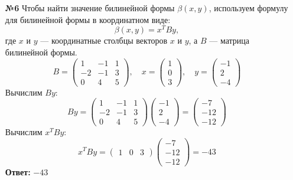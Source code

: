 \documentclass[a4paper]{article}
\begin{document}
\begin{enumerate}
    \item[\textbf{№6}]Чтобы найти значение билинейной формы 
    \( \beta(x, y) \), используем формулу для билинейной формы в координатном виде:
    \[
    \beta(x, y) = x^T B y,
    \]
    где \( x \) и \( y \) — координатные столбцы векторов 
    \( x \) и \( y \), а \( B \) — матрица билинейной формы.
    \[
    B = \begin{pmatrix}
    1 & -1 & 1 \\
    -2 & -1 & 3 \\
    0 & 4 & 5
    \end{pmatrix}, \quad
    x = \begin{pmatrix}
    1 \\
    0 \\
    3
    \end{pmatrix}, \quad
    y = \begin{pmatrix}
    -1 \\
    2 \\
    -4
    \end{pmatrix}
    \]
    Вычислим \( B y \):
    \[
    B y = \begin{pmatrix}
    1 & -1 & 1 \\
    -2 & -1 & 3 \\
    0 & 4 & 5
    \end{pmatrix}
    \begin{pmatrix}
    -1 \\
    2 \\
    -4
    \end{pmatrix}=\begin{pmatrix}
        -7 \\
        -12 \\
        -12
        \end{pmatrix}
    \]
    Вычислим \( x^T B y \):
    \small{\[
    x^T B y = \begin{pmatrix}
    1 & 0 & 3
    \end{pmatrix}
    \begin{pmatrix}
    -7 \\
    -12 \\
    -12
    \end{pmatrix}=-43
    \]}
    \textbf{Ответ: } $-43$
        
\end{enumerate}
\end{document}
